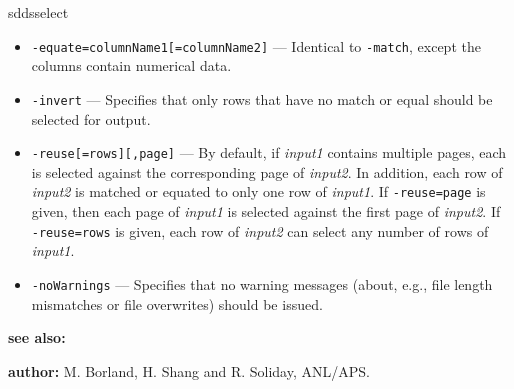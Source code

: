 \begin{sddsprog}{sddsselect}
\begin{itemize}
      \item \verb|-equate=columnName1[=columnName2]| --- Identical to \verb|-match|, except the columns contain numerical data.
      \item \verb|-invert| --- Specifies that only rows that have no match or equal should be selected for output.
      \item \verb|-reuse[=rows][,page]| --- By default, if \emph{input1} contains multiple pages, each is selected against the corresponding page of \emph{input2}. In addition, each row of \emph{input2} is matched or equated to only one row of \emph{input1}. If \verb|-reuse=page| is given, then each page of \emph{input1} is selected against the first page of \emph{input2}. If \verb|-reuse=rows| is given, each row of \emph{input2} can select any number of rows of \emph{input1}.
      \item \verb|-noWarnings| --- Specifies that no warning messages (about, e.g., file length mismatches or file overwrites) should be issued.
    \end{itemize}
  \item \textbf{see also:}  
  \item \textbf{author:} M. Borland, H. Shang and R. Soliday, ANL/APS.
\end{sddsprog}


